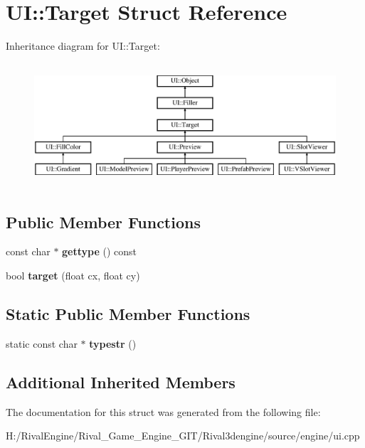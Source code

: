 \hypertarget{struct_u_i_1_1_target}{}\section{UI\+:\+:Target Struct Reference}
\label{struct_u_i_1_1_target}
Inheritance diagram for UI\+:\+:Target\+:\begin{figure}[H]
\begin{center}
\leavevmode
\includegraphics[height=4.628099cm]{struct_u_i_1_1_target}
\end{center}
\end{figure}
\subsection*{Public Member Functions}
\begin{DoxyCompactItemize}
\item 
\mbox{\label{struct_u_i_1_1_target_a0ad9f2da54557ef58c15f9e208f1561f}} 
const char $\ast$ {\bfseries gettype} () const
\item 
\mbox{\label{struct_u_i_1_1_target_a025413b66dbdf2be553d6eaa8c310d00}} 
bool {\bfseries target} (float cx, float cy)
\end{DoxyCompactItemize}
\subsection*{Static Public Member Functions}
\begin{DoxyCompactItemize}
\item 
\mbox{\label{struct_u_i_1_1_target_a7e2f36831bd15084c17be488ab1c8fbc}} 
static const char $\ast$ {\bfseries typestr} ()
\end{DoxyCompactItemize}
\subsection*{Additional Inherited Members}


The documentation for this struct was generated from the following file\+:\begin{DoxyCompactItemize}
\item 
H\+:/\+Rival\+Engine/\+Rival\+\_\+\+Game\+\_\+\+Engine\+\_\+\+G\+I\+T/\+Rival3dengine/source/engine/ui.\+cpp\end{DoxyCompactItemize}
